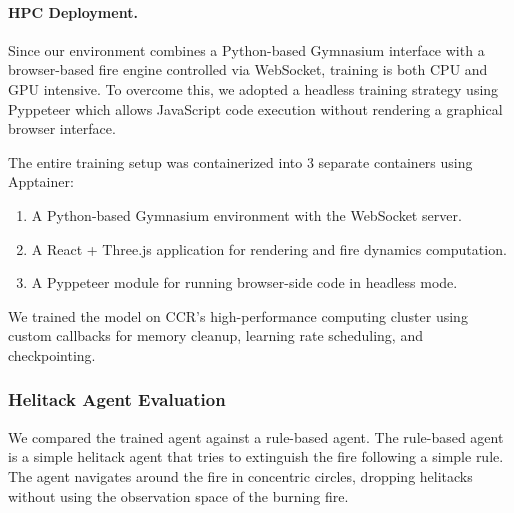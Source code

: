\documentclass[conference]{IEEEtran}
\begin{document}
\paragraph{HPC Deployment.}
Since our environment combines a Python-based Gymnasium interface with a browser-based fire engine controlled via WebSocket, training is both CPU and GPU intensive. To overcome this, we adopted a headless training strategy using Pyppeteer \cite{pyppeteer} which allows JavaScript code execution without rendering a graphical browser interface.

The entire training setup was containerized into 3 separate containers using Apptainer\cite{apptainer}:
\begin{enumerate}
    \item A Python-based Gymnasium environment with the WebSocket server.
    \item A React + Three.js application for rendering and fire dynamics computation.
    \item A Pyppeteer module for running browser-side code in headless mode.
\end{enumerate}

We trained the model on CCR's high-performance computing cluster \cite{ccr} using custom callbacks for memory cleanup, learning rate scheduling, and checkpointing.


\subsubsection{Helitack Agent Evaluation}

We compared the trained agent against a rule-based agent. The rule-based agent is a simple helitack agent that tries to extinguish the fire following a simple rule. The agent navigates around the fire in concentric circles, dropping helitacks without using the observation space of the burning fire.
\end{document}
